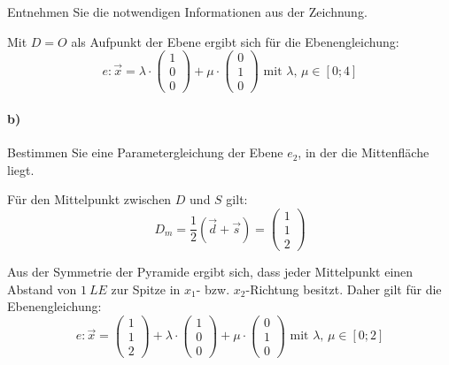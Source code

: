 \documentclass{ajc}
\numberwithin{equation}{subsection}
\begin{document}
	Entnehmen Sie die notwendigen Informationen aus der Zeichnung.
	
	Mit $D = O$ als Aufpunkt der Ebene ergibt sich für die Ebenengleichung:
	\begin{equation}
		e: \overrightarrow{x}= \lambda \cdot \left(\begin{array}{r} 1 \\ 0 \\ 0\end{array}\right) + \mu \cdot \left(\begin{array}{r} 0 \\ 1 \\ 0\end{array}\right) \text{ mit } \lambda,\,\mu \in \left[0;4\right]
	\end{equation}
	
	\paragraph{b)} Bestimmen Sie eine Parametergleichung der Ebene $e_2$, in der die Mittenfläche liegt.
	
	Für den Mittelpunkt zwischen $D$ und $S$ gilt:
	\begin{equation}
		D_m = \frac{1}{2} \left(\vec{d} + \vec{s}\right) = \left(\begin{array}{r} 1 \\ 1 \\ 2\end{array}\right)
	\end{equation}
	
	Aus der Symmetrie der Pyramide ergibt sich, dass jeder Mittelpunkt einen Abstand von $\SI{1}{LE}$ zur Spitze in $x_1$- bzw. $x_2$-Richtung besitzt. Daher gilt für die Ebenengleichung:
	\begin{equation}
		e: \overrightarrow{x}=\left(\begin{array}{r} 1 \\ 1 \\ 2\end{array}\right) + \lambda \cdot \left(\begin{array}{r} 1 \\ 0 \\ 0\end{array}\right) + \mu \cdot \left(\begin{array}{r} 0 \\ 1 \\ 0\end{array}\right) \text{ mit } \lambda,\,\mu \in \left[0;2\right]
	\end{equation}
	
\end{document}
